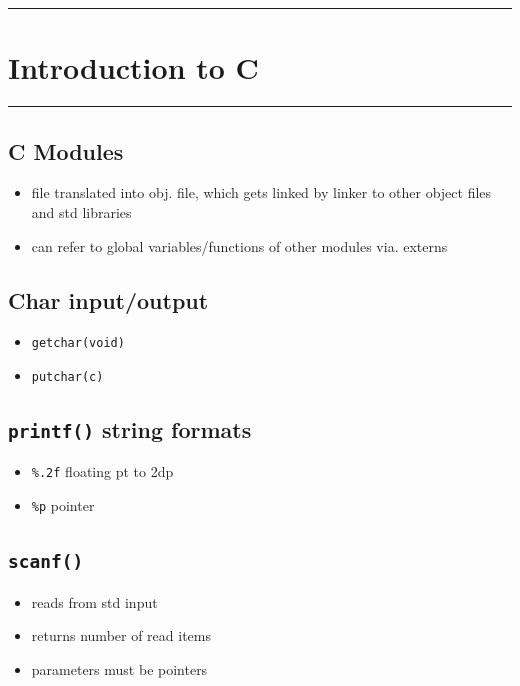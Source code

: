 \documentclass[10pt, multicolumn, a4paper]{article}
\begin{document}
\linespread{1} %
\small \normalsize %



\setcounter{section}{1} %
\hrule
\section{Introduction to C} 
\hrule

\begin{multicols}{2}
	\subsection*{C Modules}
	\begin{itemize}
	\item file translated into obj. file, which gets linked by linker to other object files and std libraries
	\item can refer to global variables/functions of other modules via. externs
	\end{itemize}
	\subsection*{Char input/output}
	\begin{itemize}
	\item \verb|getchar(void)|
	\item \verb|putchar(c)|
	\end{itemize}
	\subsection*{\texttt{printf()} string formats}
	\begin{itemize}
	\item \verb|%.2f| floating pt to 2dp
	\item \verb|%p| pointer
	\end{itemize}
	\subsection*{\texttt{scanf()}}
	\begin{itemize}
	\item reads from std input
	\item returns number of read items
	\item parameters must be pointers
	\end{itemize} 
\end{multicols}
\end{document}
